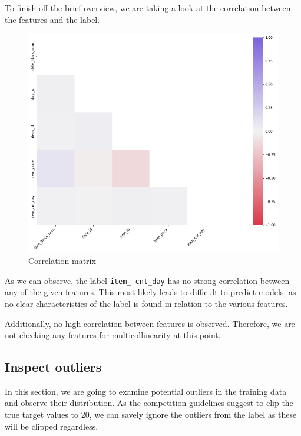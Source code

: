 To finish off the brief overview, we are taking a look at the correlation between the features and the label.

\begin{figure}
\centering
  \includegraphics[width=0.85\linewidth]{external_content/graphs/corr_matrix.png}
\captionsetup{justification=centering}
\caption{Correlation matrix}
\label{corr_matrix}
\end{figure}

\vspace*{6mm}
\noindent As we can observe, the label \texttt{item\_ cnt\_day} has no strong correlation between any of the given features. 
This most likely leads to difficult to predict models, as no clear characteristics of the label is found in relation to the various features.

\noindent Additionally, no high correlation between features is observed. Therefore, we are not checking any features for multicollinearity at this point. \cite{MultivariateStatistics}

\subsection{Inspect outliers}\label{outliers}

In this section, we are going to examine potential outliers in the training data and observe their distribution. As the \href{https://www.kaggle.com/c/competitive-data-science-predict-future-sales/overview/evaluation}{competition guidelines} suggest to clip the true target values to 20, we can savely ignore the outliers from the label as these will be clipped regardless.

